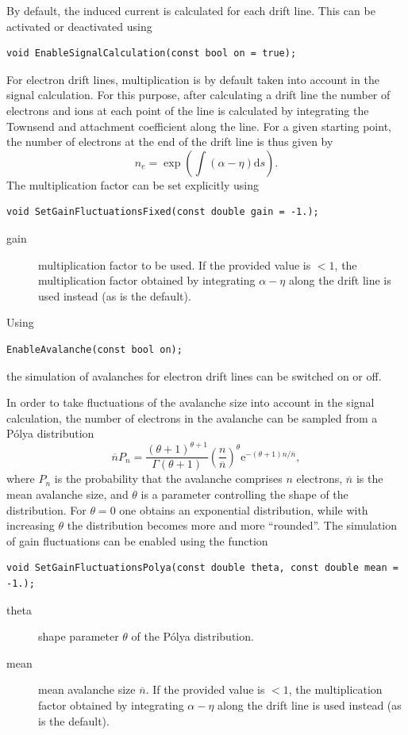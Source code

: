 By default, the induced current is calculated for each drift line.
This can be activated or deactivated using
\begin{lstlisting}
void EnableSignalCalculation(const bool on = true);
\end{lstlisting}

For electron drift lines, multiplication is by default taken into account in the signal 
calculation. For this purpose, after calculating a drift line
the number of electrons and ions at each point of the line is calculated 
by integrating the Townsend and attachment coefficient along the line. 
For a given starting point, 
the number of electrons at the end of the drift line is thus given by 
\begin{equation*}
  n_{e} = \exp\left(\int\left(\alpha - \eta\right)\text{d}s\right).
\end{equation*}
The multiplication factor can be set explicitly using
\begin{lstlisting}
void SetGainFluctuationsFixed(const double gain = -1.);
\end{lstlisting}
\begin{description}
  \item[gain] multiplication factor to be used. 
  If the provided value is $< 1$, the multiplication factor 
  obtained by integrating $\alpha - \eta$ along the 
  drift line is used instead (as is the default).
\end{description} 
Using 
\begin{lstlisting}
EnableAvalanche(const bool on);
\end{lstlisting}
the simulation of avalanches for electron drift lines can be switched on or off. 

In order to take fluctuations of the avalanche size into account in 
the signal calculation, the number of electrons in the avalanche 
can be sampled from a P\'olya distribution \cite{Alkhazov1970}
\begin{equation*}
 \overline{n}P_{n} = \frac{\left(\theta + 1\right)^{\theta + 1}}{\Gamma\left(\theta + 1\right)}\left(\frac{n}{\overline{n}}\right)^{\theta}\text{e}^{-\left(\theta + 1\right)n/\overline{n}},
\end{equation*}
where $P_{n}$ is the probability that the avalanche comprises $n$ electrons, 
$\overline{n}$ is the mean avalanche size, and $\theta$ is a parameter 
controlling the shape of the distribution. For $\theta = 0$ one obtains an 
exponential distribution, while with increasing $\theta$ the distribution becomes 
more and more ``rounded''. The simulation of gain fluctuations can be enabled using 
the function 
\begin{lstlisting}
void SetGainFluctuationsPolya(const double theta, const double mean = -1.);
\end{lstlisting}
\begin{description}
  \item[theta] shape parameter $\theta$ of the P\'olya distribution.
  \item[mean] mean avalanche size $\overline{n}$. 
  If the provided value is $< 1$, the multiplication factor 
  obtained by integrating $\alpha - \eta$ along the 
  drift line is used instead (as is the default).
\end{description}

